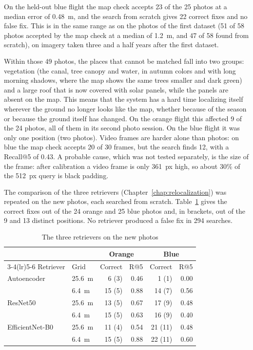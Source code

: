 \documentclass[english, Lau, oneside]{sapthesis}%
\begin{document}
On the held-out blue flight the map check accepts 23 of the 25 photos at a median error of 0.48~m, and the search from scratch gives 22 correct fixes and no false fix. This is in the same range as on the photos of the first dataset (51 of 58 photos accepted by the map check at a median of 1.2~m, and 47 of 58 found from scratch), on imagery taken three and a half years after the first dataset.

Within those 49 photos, the places that cannot be matched fall into two groups: vegetation (the canal, tree canopy and water, in autumn colors and with long morning shadows, where the map shows the same trees smaller and dark green) and a large roof that is now covered with solar panels, while the panels are absent on the map. This means that the system has a hard time localizing itself wherever the ground no longer looks like the map, whether because of the season or because the ground itself has changed. On the orange flight this affected 9 of the 24 photos, all of them in its second photo session. On the blue flight it was only one position (two photos). Video frames are harder alone than photos: on blue the map check accepts 20 of 30 frames, but the search finds 12, with a Recall@5 of 0.43. A probable cause, which was not tested separately, is the size of the frame: after calibration a video frame is only 361~px high, so about 30\% of the 512~px query is black padding.

The comparison of the three retrievers (Chapter~\ref{chap:relocalization}) was repeated on the new photos, each searched from scratch. Table~\ref{tab:real-retrievers} gives the correct fixes out of the 24 orange and 25 blue photos and, in brackets, out of the 9 and 13 distinct positions. No retriever produced a false fix in 294 searches.

\begin{table}[!htbp]
  \centering
  \caption{The three retrievers on the new photos}
  \label{tab:real-retrievers}
  \small
  \begin{tabular}{llrrrr}
    \toprule
     & & \multicolumn{2}{c}{Orange} & \multicolumn{2}{c}{Blue} \\
    \cmidrule(lr){3-4}\cmidrule(lr){5-6}
    Retriever & Grid & Correct & R@5 & Correct & R@5 \\
    \midrule
    Autoencoder & 25.6~m & 6 (3) & 0.46 & 1 (1) & 0.00 \\
     & 6.4~m & 15 (5) & 0.88 & 14 (7) & 0.56 \\
    \addlinespace
    ResNet50 & 25.6~m & 13 (5) & 0.67 & 17 (9) & 0.48 \\
     & 6.4~m & 15 (5) & 0.63 & 16 (9) & 0.40 \\
    \addlinespace
    EfficientNet-B0 & 25.6~m & 11 (4) & 0.54 & 21 (11) & 0.48 \\
     & 6.4~m & 15 (5) & 0.88 & 22 (11) & 0.60 \\
    \bottomrule
  \end{tabular}
\end{table}
\end{document}
